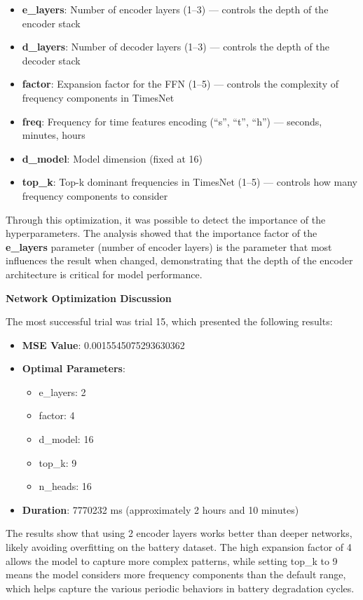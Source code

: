 \begin{itemize}
    \item \textbf{e\_layers}: Number of encoder layers (1--3) --- controls the depth of the encoder stack
    \item \textbf{d\_layers}: Number of decoder layers (1--3) --- controls the depth of the decoder stack  
    \item \textbf{factor}: Expansion factor for the FFN (1--5) --- controls the complexity of frequency components in TimesNet
    \item \textbf{freq}: Frequency for time features encoding (``s'', ``t'', ``h'') --- seconds, minutes, hours
    \item \textbf{d\_model}: Model dimension (fixed at 16)
    \item \textbf{top\_k}: Top-k dominant frequencies in TimesNet (1--5) --- controls how many frequency components to consider
\end{itemize}

Through this optimization, it was possible to detect the importance of the hyperparameters. The analysis showed that the importance factor of the \textbf{e\_layers} parameter (number of encoder layers) is the parameter that most influences the result when changed, demonstrating that the depth of the encoder architecture is critical for model performance.

\textbf{Network Optimization Discussion}
\label{subsec:best_trial_results}

The most successful trial was trial 15, which presented the following results:

\begin{itemize}
    \item \textbf{MSE Value}: 0.0015545075293630362
    \item \textbf{Optimal Parameters}:
    \begin{itemize}
        \item e\_layers: 2
        \item factor: 4  
        \item d\_model: 16
        \item top\_k: 9
        \item n\_heads: 16
    \end{itemize}
    \item \textbf{Duration}: 7770232 ms (approximately 2 hours and 10 minutes)
\end{itemize}

The results show that using 2 encoder layers works better than deeper networks, likely avoiding overfitting on the battery dataset. The high expansion factor of 4 allows the model to capture more complex patterns, while setting top\_k to 9 means the model considers more frequency components than the default range, which helps capture the various periodic behaviors in battery degradation cycles.


